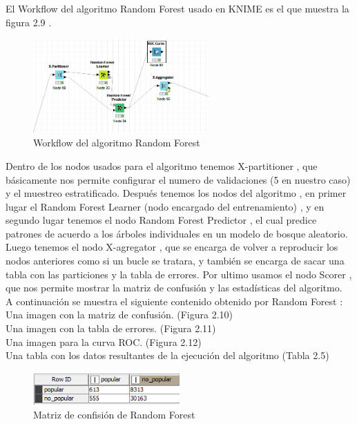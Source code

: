 	El Workflow del algoritmo Random Forest usado en KNIME 
	es el que muestra la figura 2.9 . 

	\begin{figure}[htb]
		\centering
		\includegraphics[width=0.6\textwidth]{./imagenes/13}
		\caption{Workflow del algoritmo Random Forest} \label{fig:13}
	\end{figure}

	Dentro de los nodos usados para el algoritmo tenemos X-partitioner , que básicamente nos permite configurar el numero de validaciones
	(5 en nuestro caso) y el muestreo estratificado. Después tenemos los nodos del algoritmo , en primer lugar el Random Forest Learner (nodo encargado del entrenamiento)
	, y en segundo lugar tenemos el nodo Random Forest Predictor , el cual predice patrones de acuerdo a los árboles
	individuales en un modelo de bosque aleatorio. Luego tenemos el nodo X-agregator  , que se encarga de volver a reproducir los nodos anteriores como si un bucle se tratara,
	y también se encarga de sacar una tabla con las particiones y la tabla de errores. Por ultimo usamos el nodo Scorer , que nos permite mostrar la matriz de confusión y las estadísticas del algoritmo. \\

	A continuación se muestra el siguiente contenido obtenido por Random Forest :	\\
	Una imagen con la matriz de confusión. (Figura 2.10) \\
	Una imagen con la tabla de errores. (Figura 2.11) \\
	Una imagen para la curva ROC. (Figura 2.12)	\\
	Una tabla con los datos resultantes de la ejecución del algoritmo (Tabla 2.5)\\

	\begin{figure}[htb]
		\centering
		\includegraphics[width=0.5\textwidth]{./imagenes/14}
		\caption{Matriz de confisión de Random Forest} \label{fig:2}
	\end{figure}

